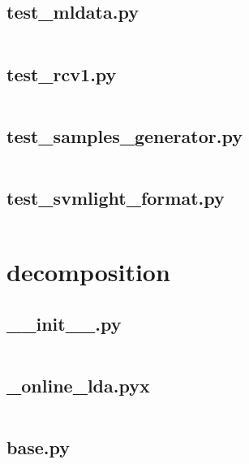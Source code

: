 \documentclass{article}
\begin{document}
\subsection{test\_mldata.py}
\inputminted{python}{/home/dufferzafar/dev/@clones/scikit-learn/sklearn/datasets/tests/test_mldata.py}
\newpage

\subsection{test\_rcv1.py}
\inputminted{python}{/home/dufferzafar/dev/@clones/scikit-learn/sklearn/datasets/tests/test_rcv1.py}
\newpage

\subsection{test\_samples\_generator.py}
\inputminted{python}{/home/dufferzafar/dev/@clones/scikit-learn/sklearn/datasets/tests/test_samples_generator.py}
\newpage

\subsection{test\_svmlight\_format.py}
\inputminted{python}{/home/dufferzafar/dev/@clones/scikit-learn/sklearn/datasets/tests/test_svmlight_format.py}
\newpage

\section{decomposition}

\subsection{\_\_init\_\_.py}
\inputminted{python}{/home/dufferzafar/dev/@clones/scikit-learn/sklearn/decomposition/__init__.py}
\newpage

\subsection{\_online\_lda.pyx}
\inputminted{cython}{/home/dufferzafar/dev/@clones/scikit-learn/sklearn/decomposition/_online_lda.pyx}
\newpage

\subsection{base.py}
\inputminted{python}{/home/dufferzafar/dev/@clones/scikit-learn/sklearn/decomposition/base.py}
\newpage
\end{document}
